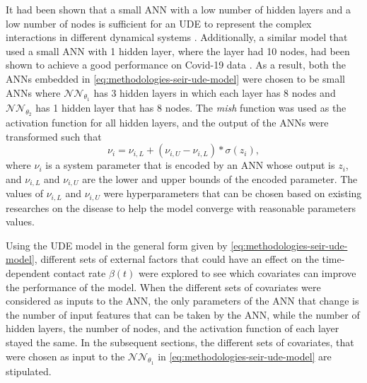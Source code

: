 It had been shown that a small \gls{ANN} with a low number of hidden layers and a low number of nodes is sufficient for an \gls{UDE} to represent the complex interactions in different dynamical systems \cite{rackauckasUniversalDifferentialEquations2020}.
Additionally, a similar model that used a small \gls{ANN} with 1 hidden layer, where the layer had 10 nodes, had been shown to achieve a good performance on Covid-19 data \cite{dandekarMachineLearningAidedGlobal2020a}.
As a result, both the \glspl{ANN} embedded in \autoref{eq:methodologies-seir-ude-model} were chosen to be small \glspl{ANN} where $\mathcal{NN}_{\theta_1}$ has 3 hidden layers in which each layer has 8 nodes and $\mathcal{NN}_{\theta_2}$ has 1 hidden layer that has 8 nodes.
The \textit{mish} function \cite{misraMishSelfRegularized2020} was used as the activation function for all hidden layers, and the output of the \glspl{ANN} were transformed such that
\begin{equation}
    \nu_i = \nu_{i,L} + (\nu_{i,U} - \nu_{i,L}) * \sigma (z_i),
\end{equation}
where $\nu_i$ is a system parameter that is encoded by an \gls{ANN} whose output is $z_i$, and $\nu_{i,L}$ and $\nu_{i,U}$ are the lower and upper bounds of the encoded parameter.
The values of $\nu_{i,L}$ and $\nu_{i,U}$ were hyperparameters that can be chosen based on existing researches on the disease to help the model converge with reasonable parameters values.

Using the \gls{UDE} model in the general form given by \autoref{eq:methodologies-seir-ude-model}, different sets of external factors that could have an effect on the time-dependent contact rate $\beta (t)$ were explored to see which covariates can improve the performance of the model.
When the different sets of covariates were considered as inputs to the \gls{ANN}, the only parameters of the \gls{ANN} that change is the number of input features that can be taken by the \gls{ANN}, while the number of hidden layers, the number of nodes, and the activation function of each layer stayed the same.
In the subsequent sections, the different sets of covariates, that were chosen as input to the $\mathcal{NN}_{\theta_1}$ in \autoref{eq:methodologies-seir-ude-model} are stipulated.

